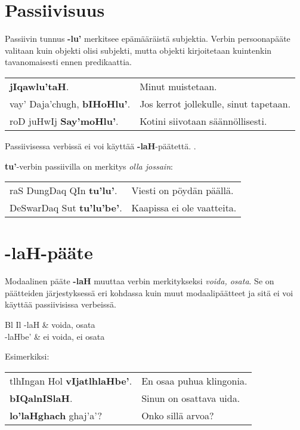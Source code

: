 \documentclass{book}
\begin{document}
\section{Passiivisuus}\label{sec:passiivi}

Passiivin tunnus \textbf{-lu'} merkitsee epämääräistä subjektia.
Verbin persoonapääte valitaan kuin objekti olisi subjekti, mutta objekti kirjoitetaan kuintenkin tavanomaisesti ennen predikaattia.

\begin{tabular}{l l}
    \textbf{jIqawlu'taH}. & Minut muistetaan. \\
    vay' Daja'chugh, \textbf{bIHoHlu'}. & Jos kerrot jollekulle, sinut tapetaan. \\
    roD juHwIj \textbf{Say'moHlu'}. & Kotini siivotaan säännöllisesti. \\
\end{tabular}

Passiivisessa verbissä ei voi käyttää \textbf{-laH}-päätettä.
.

\textbf{tu'}-verbin passiivilla on merkitys \textit{olla jossain}:

\begin{tabular}{l l}
    raS DungDaq QIn \textbf{tu'lu'}. & Viesti on pöydän päällä. \\
    DeSwarDaq Sut \textbf{tu'lu'be'}. & Kaapissa ei ole vaatteita. \\
\end{tabular}

\section{-laH-pääte}
\label{sec:laH}

Modaalinen pääte \textbf{-laH} muuttaa verbin merkitykseksi \textit{voida, osata}.
Se on päätteiden järjestyksessä eri kohdassa kuin muut modaalipäätteet ja sitä ei voi käyttää passiivisissa verbeissä.

\begin{tabular}{Bl Il}
    -laH & voida, osata \\
    -laHbe' & ei voida, ei osata \\
\end{tabular}

Esimerkiksi:

\begin{tabular}{l l}
    tlhIngan Hol \textbf{vIjatlhlaHbe'}. & En osaa puhua klingonia. \\
    \textbf{bIQalnISlaH}. & Sinun on osattava uida. \\
    \textbf{lo'laHghach} ghaj'a'? & Onko sillä arvoa? \\
\end{tabular}
\end{document}
